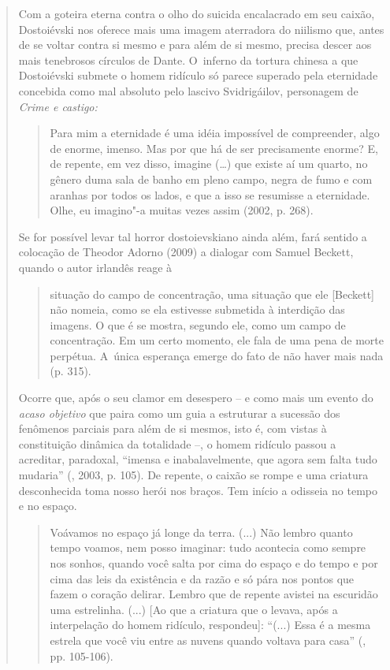 {\begin{quote}
Com a goteira eterna contra o olho do suicida encalacrado em seu caixão,
Dostoiévski nos oferece mais uma imagem aterradora do niilismo que,
antes de se voltar contra si mesmo e para além de si mesmo, precisa
descer aos mais tenebrosos círculos de Dante. O~inferno da tortura
chinesa a que Dostoiévski submete o homem ridículo só parece superado
pela eternidade concebida como mal absoluto pelo lascivo Svidrigáilov,
personagem de \emph{Crime e castigo: }

\begin{quote}
Para mim a eternidade é uma idéia impossível de compreender, algo de
enorme, imenso. Mas por que há de ser precisamente enorme? E, de
repente, em vez disso, imagine (\ldots{}) que existe aí um quarto, no
gênero duma sala de banho em pleno campo, negra de fumo e com aranhas
por todos os lados, e que a isso se resumisse a eternidade. Olhe, eu
imagino"-a muitas vezes assim (2002, p. 268).
\end{quote}

Se for possível levar tal horror dostoievskiano ainda além, fará sentido
a colocação de Theodor Adorno (2009) a dialogar com Samuel Beckett,
quando o autor irlandês reage à

\begin{quote}
situação do campo de concentração, uma situação que ele {[}Beckett{]}
não nomeia, como se ela estivesse submetida à interdição das imagens. O
que é se mostra, segundo ele, como um campo de concentração. Em um certo
momento, ele fala de uma pena de morte perpétua. A~única esperança
emerge do fato de não haver mais nada (p. 315).
\end{quote}

Ocorre que, após o seu clamor em desespero -- e como mais um evento do
\emph{acaso objetivo} que paira como um guia a estruturar a sucessão dos
fenômenos parciais para além de si mesmos, isto é, com vistas à
constituição dinâmica da totalidade --, o homem ridículo passou a
acreditar, paradoxal, ``imensa e inabalavelmente, que agora sem falta
tudo mudaria'' (, 2003, p. 105). De repente, o caixão se
rompe e uma criatura desconhecida toma nosso herói nos braços. Tem
início a odisseia no tempo e no espaço.

\begin{quote}
Voávamos no espaço já longe da terra. (...) Não lembro quanto tempo
voamos, nem posso imaginar: tudo acontecia como sempre nos sonhos,
quando você salta por cima do espaço e do tempo e por cima das leis da
existência e da razão e só pára nos pontos que fazem o coração delirar.
Lembro que de repente avistei na escuridão uma estrelinha. (...) {[}Ao
que a criatura que o levava, após a interpelação do homem ridículo,
respondeu{]}: ``(...) Essa é a mesma estrela que você viu entre as
nuvens quando voltava para casa'' (, pp. 105-106).
\end{quote}


\end{quote}}
